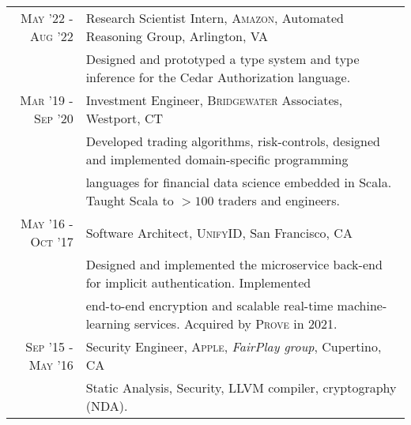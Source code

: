 \begin{tabular}{rl}
\textsc{May} '22 - \textsc{Aug} '22 & Research Scientist Intern, \textsc{Amazon}, Automated Reasoning Group, Arlington, VA\\
&\footnotesize{Designed and prototyped a type system and type inference for the Cedar Authorization language.}\\[0.5em]

\textsc{Mar} '19 - \textsc{Sep} '20 & Investment Engineer, \textsc{Bridgewater} Associates, Westport, CT\\
&\footnotesize{Developed trading algorithms, risk-controls, designed and implemented domain-specific programming}\\
&\footnotesize{languages for financial data science embedded in Scala. Taught Scala to $>100$ traders and engineers.}\\[0.5em]

\textsc{May} '16 - \textsc{Oct} '17 & Software Architect, \textsc{UnifyID}, San Francisco, CA\\
&\footnotesize{Designed and implemented the microservice back-end for implicit authentication. Implemented}\\
&\footnotesize{end-to-end encryption and scalable real-time machine-learning services. Acquired by \textsc{Prove} in 2021.}\\[0.5em]

\textsc{Sep} '15 - \textsc{May} '16 & Security Engineer, \textsc{Apple}, \emph{FairPlay group}, Cupertino, CA \\
&\footnotesize{Static Analysis, Security, LLVM compiler, cryptography (NDA).}\\[0.5em]
\end{tabular}



